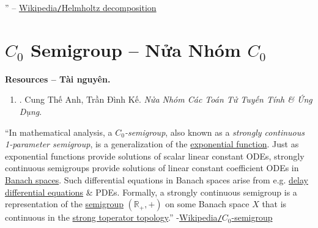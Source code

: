 \documentclass{article}
\begin{document}
'' -- \href{https://en.wikipedia.org/wiki/Helmholtz_decomposition}{Wikipedia{\tt/}Helmholtz decomposition}


\section{$C_0$ Semigroup -- Nửa Nhóm $C_0$}
\textbf{\textsf{Resources -- Tài nguyên.}}
\begin{enumerate}
	\item \cite{Anh_Ke_semigroup}. {\sc Cung Thế Anh, Trần Đình Kế}. {\it Nửa Nhóm Các Toán Tử Tuyến Tính \& Ứng Dụng}.
\end{enumerate}
``In mathematical analysis, a {\it $C_0$-semigroup}, also known as a {\it strongly continuous 1-parameter semigroup}, is a generalization of the \href{https://en.wikipedia.org/wiki/Exponential_function}{exponential function}. Just as exponential functions provide solutions of scalar linear constant ODEs, strongly continuous semigroups provide solutions of linear constant coefficient ODEs in \href{https://en.wikipedia.org/wiki/Banach_space}{Banach spaces}. Such differential equations in Banach spaces arise from e.g. \href{https://en.wikipedia.org/wiki/Delay_differential_equation}{delay differential equations} \& PDEs. Formally, a strongly continuous semigroup is a representation of the \href{https://en.wikipedia.org/wiki/Semigroup}{semigroup} $(\mathbb{R}_+,+)$ on some Banach space $X$ that is continuous in the \href{https://en.wikipedia.org/wiki/Strong_operator_topology}{strong toperator topology}.'' -\href{https://en.wikipedia.org/wiki/C0-semigroup}{Wikipedia{\tt/}$C_0$-semigroup}

\end{document}
